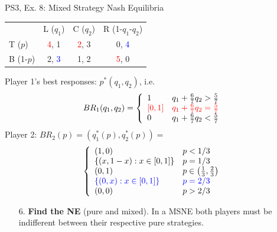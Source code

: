 \begin{frame}{PS3, Ex. 8: Mixed Strategy Nash Equilibria}
  \begin{multicols}{2}
    \begin{table}
      \begin{tabular}{l|c|c|c|}
          \multicolumn{1}{c}{}  & \multicolumn{1}{c}{L ($q_1$)} & \multicolumn{1}{c}{C ($q_2$)} & \multicolumn{1}{c}{R (1-$q_1$-$q_2$)} \\\cline{2-4}
          T ($p$)   & \textcolor{red}{4}, 1 & \textcolor{red}{2}, 3 & 0, \textcolor{blue}{4} \\\cline{2-4}
          B (1-$p$) & 2, \textcolor{blue}{3} & 1, 2 & \textcolor{red}{5}, 0 \\\cline{2-4}
      \end{tabular}
    \end{table}
    Player 1's best responses: $p^{*}(q_1,q_2)$, i.e.
    \begin{align*}
      BR_1(q_1,q_2)=
      \left\{ \begin{array}{ll}
          1                 & q_1 + \frac{6}{7}q_2 > \frac{5}{7}\\
          \textcolor{red}{\left[0,1\right]}  & \textcolor{red}{q_1 + \frac{6}{7}q_2 = \frac{5}{7}}\\
          0                 & q_1 + \frac{6}{7}q_2 < \frac{5}{7}
      \end{array}\right.
    \end{align*}
    Player 2: $BR_2(p)=\left(q_1^{*}(p),q_2^{*}(p)\right)=$
    \begin{align*}
      \left\{ \begin{array}{ll}
          (1,0)                 & p < 1/3 \\
          \{(x,1-x):x\in[0,1]\} & p = 1/3 \\
          (0,1)                 & p\in\left(\frac{1}{3},\frac{2}{3}\right)\\
          \textcolor{blue}{\{(0,x):x\in[0,1]\}}   & \textcolor{blue}{p = 2/3} \\
          (0,0)                 & p > 2/3
      \end{array}\right.
    \end{align*}
  \vfill\null \columnbreak
    \begin{itemize}
      \item[6.] \textbf{Find the NE} (pure and mixed). In a MSNE both players must be indifferent between their respective pure strategies.
    \end{itemize}

\end{multicols}
\end{frame}
